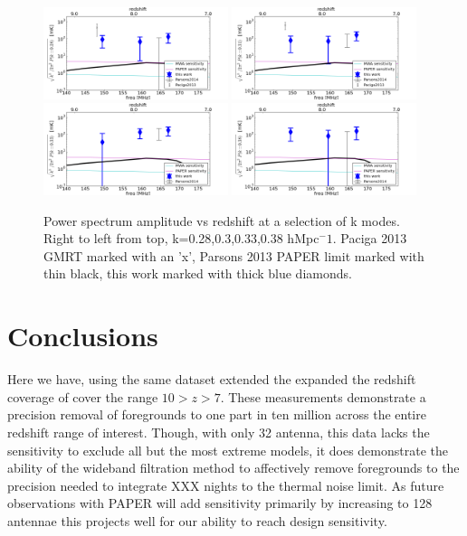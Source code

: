 \documentclass[preprint]{aastex}
\begin{document}
\begin{figure}
\centering
\includegraphics[width=0.48\textwidth]{figures/psa_p3k_vs_z_28.png}
\includegraphics[width=0.48\textwidth]{figures/psa_p3k_vs_z_30.png}
\includegraphics[width=0.48\textwidth]{figures/psa_p3k_vs_z_33.png}
\includegraphics[width=0.48\textwidth]{figures/psa_p3k_vs_z_38.png}
\caption{Power spectrum amplitude vs redshift at a selection of k modes. Right to left from top, k=0.28,0.3,0.33,0.38 hMpc$^-1$.  Paciga 2013 GMRT marked with an 'x', Parsons 2013 PAPER limit marked with thin black, this work marked with thick blue diamonds. \label{fig:slices}}
\end{figure}

\section{Conclusions}
\label{sec:conclusion}
Here we have, using the same dataset extended the expanded the redshift coverage of \cite{Parsons:2013p9876} cover the range $10>z>7$.  These measurements demonstrate a precision removal of foregrounds to one part in ten million across the entire redshift range of interest. Though, with only 32 antenna, this data lacks the sensitivity to exclude all but the most extreme models, it does demonstrate the ability of the wideband filtration method to affectively remove foregrounds to the precision needed to integrate XXX nights to the thermal noise limit.  As future observations with PAPER  will add sensitivity primarily by increasing to 128 antennae this projects well for our ability to reach design sensitivity. 
\end{document}
